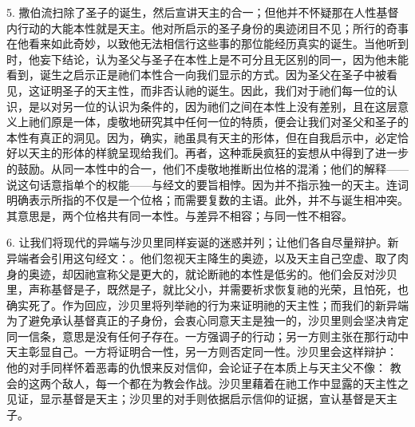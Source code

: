 5. 撒伯流扫除了圣子的诞生，然后宣讲天主的合一；但他并不怀疑那在人性基督内行动的大能本性就是天主。他对所启示的圣子身份的奥迹闭目不见；所行的奇事在他看来如此奇妙，以致他无法相信行这些事的那位能经历真实的诞生。当他听到时，他妄下结论，认为圣父与圣子在本性上是不可分且无区别的同一，因为他未能看到，诞生之启示正是祂们本性合一向我们显示的方式。因为圣父在圣子中被看见，这证明圣子的天主性，而非否认祂的诞生。因此，我们对于祂们每一位的认识，是以对另一位的认识为条件的，因为祂们之间在本性上没有差别，且在这层意义上祂们原是一体，虔敬地研究其中任何一位的特质，便会让我们对圣父和圣子的本性有真正的洞见。因为，确实，祂虽具有天主的形体，但在自我启示中，必定恰好以天主的形体的样貌呈现给我们。再者，这种乖戾疯狂的妄想从中得到了进一步的鼓励。从同一本性中的合一，他们不虔敬地推断出位格的混淆；他们的解释——说这句话意指单个的权能——与经文的要旨相悖。因为并不指示独一的天主。连词明确表示所指的不仅是一个位格；而需要复数的主语。此外，并不与诞生相冲突。其意思是，两个位格共有同一本性。与差异不相容；与同一性不相容。\par

6. 让我们将现代的异端与沙贝里同样妄诞的迷惑并列；让他们各自尽量辩护。新异端者会引用这句经文：。他们忽视天主降生的奥迹，以及天主自己空虚、取了肉身的奥迹，却因祂宣称父是更大的，就论断祂的本性是低劣的。他们会反对沙贝里，声称基督是子，既然是子，就比父小，并需要祈求恢复祂的光荣，且怕死，也确实死了。作为回应，沙贝里将列举祂的行为来证明祂的天主性；而我们的新异端为了避免承认基督真正的子身份，会衷心同意天主是独一的，沙贝里则会坚决肯定同一信条，意思是没有任何子存在。一方强调子的行动；另一方则主张在那行动中天主彰显自己。一方将证明合一性，另一方则否定同一性。沙贝里会这样辩护： 他的对手同样怀着恶毒的仇恨来反对信仰，会论证子在本质上与天主父不像： 教会的这两个敌人，每一个都在为教会作战。沙贝里藉着在祂工作中显露的天主性之见证，显示基督是天主；沙贝里的对手则依据启示信仰的证据，宣认基督是天主子。\par


